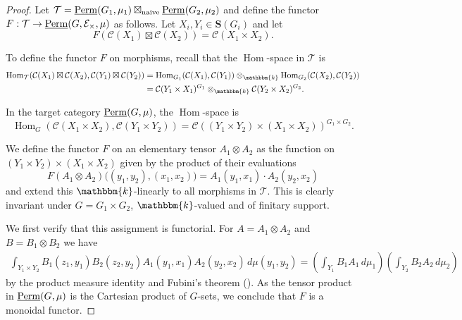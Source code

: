 \documentclass[11pt,a4paper]{amsart}
\theoremstyle{plain}%
\theoremstyle{definition}
\theoremstyle{remark}
\newcommand{\Hom}{\operatorname{Hom}}
\newcommand{\Perm}{\underline{{\rm Perm}}}
\newcommand{\kk}{\mathbbm{k}}
\newcommand{\cC}{\mathcal{C}}
\newcommand{\cE}{\mathcal{E}}
\newcommand{\Set}[1]{\mathbf{S}(#1)}
\begin{document}
\begin{proof}
Let $\mathcal{T} = \Perm(G_1, \mu_1) \boxtimes_{\mathrm{naive}} \Perm(G_2, \mu_2)$ and define the functor $F: \mathcal{T} \to \Perm(G, \cE_{\times},\mu)$ as follows. Let $X_i, Y_i \in \Set{G_i}$ and let \[ F(\mathcal{C}(X_1) \boxtimes \mathcal{C}(X_2)) = \mathcal{C}(X_1 \times X_2).\]

To define the functor $F$ on morphisms, recall that the $\Hom$-space in $\mathcal{T}$ is 
\begin{align*}
    \Hom_{\mathcal{T}}(\mathcal{C}(X_1) \boxtimes \mathcal{C}(X_2), \mathcal{C}(Y_1) \boxtimes \mathcal{C}(Y_2)) &= \Hom_{G_1}(\mathcal{C}(X_1),\mathcal{C}(Y_1)) \otimes_\kk \Hom_{G_2}(\mathcal{C}(X_2), \mathcal{C}(Y_2))\\
&=\cC(Y_1 \times X_1)^{G_1} \otimes_\kk \cC(Y_2 \times X_2)^{G_2}.
\end{align*}  


In the target category $\Perm(G, \mu)$, the $\Hom$-space is
\[ \Hom_G(\mathcal{C}(X_1 \times X_2), \mathcal{C}(Y_1 \times Y_2)) = \cC((Y_1 \times Y_2) \times (X_1 \times X_2))^{G_1 \times G_2}.\]

We define the functor $F$ on an elementary tensor $A_1 \otimes A_2$ as the function on $(Y_1 \times Y_2) \times (X_1 \times X_2)$ given by the product of their evaluations
$$F(A_1 \otimes A_2)\big((y_1, y_2), (x_1, x_2)\big) = A_1(y_1, x_1) \cdot A_2(y_2, x_2)$$ and extend this $\kk$-linearly to all morphisms in $\mathcal{T}$. This is clearly invariant under $G = G_1 \times G_2$, $\kk$-valued and of finitary support.


\medskip

We first verify that this assignment is functorial. For $A = A_1 \otimes A_2$ and $B = B_1 \otimes B_2$ we have
\begin{align*} \int_{Y_1 \times Y_2} B_1(z_1, y_1) B_2(z_2, y_2) A_1(y_1, x_1) A_2(y_2, x_2) \, d\mu(y_1, y_2) = \left( \int_{Y_1} B_1 A_1 \, d\mu_1 \right) \left( \int_{Y_2} B_2 A_2 \, d\mu_2 \right)\end{align*} by the product measure identity and Fubini's theorem (\cite[Corollary 4.9]{HS-oligomorphic}). As the tensor product in $\Perm(G,\mu)$ is the Cartesian product of $G$-sets, we conclude that $F$ is a monoidal functor.


\end{proof}
\end{document}
